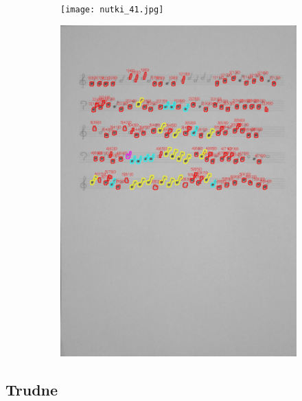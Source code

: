 \documentclass[11pt]{article}
\begin{document}
\begin{figure}[H]
    \centering
    \begin{subfigure}{.5\textwidth}
        \centering
        \graphicspath{ {Resources/} }
        \texttt{[image: nutki\_41.jpg]}
        \label{fig:sub1}
    \end{subfigure}%
    \begin{subfigure}{.5\textwidth}
        \centering
        \graphicspath{ {blobs/} }
        \includegraphics[width=\linewidth]{41_cnts.jpg}
        \label{fig:sub2}
    \end{subfigure}
    \label{fig:test}
\end{figure}



\subsection{Trudne}
\end{document}
